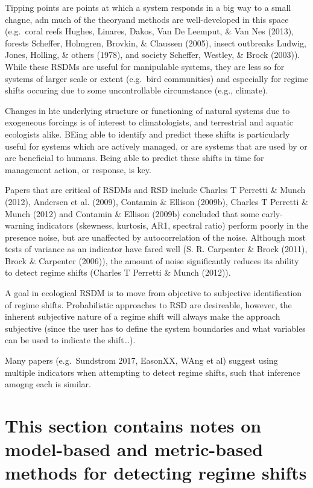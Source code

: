\documentclass[12pt,twoside,openany]{reedthesis}
\begin{document}
Tipping points are points at which a system responds in a big way to a
small chagne, adn much of the theoryand methods are well-developed in
this space (e.g.~coral reefs Hughes, Linares, Dakos, Van De Leemput, \&
Van Nes (2013), forests Scheffer, Holmgren, Brovkin, \& Claussen (2005),
insect outbreaks Ludwig, Jones, Holling, \& others (1978), and society
Scheffer, Westley, \& Brock (2003)). While these RSDMs are useful for
manipulable systems, they are less so for systems of larger scale or
extent (e.g.~bird communities) and especially for regime shifts occuring
due to some uncontrollable circumstance (e.g., climate).

Changes in hte underlying structure or functioning of natural systems
due to exogeneous forcings is of interest to climatologists, and
terrestrial and aquatic ecologists alike. BEing able to identify and
predict these shifts is particularly useful for systems which are
actively managed, or are systems that are used by or are beneficial to
humans. Being able to predict these shifts in time for management
action, or response, is key.

Papers that are critical of RSDMs and RSD include Charles T Perretti \&
Munch (2012), Andersen et al. (2009), Contamin \& Ellison (2009b),
Charles T Perretti \& Munch (2012) and Contamin \& Ellison (2009b)
concluded that some early-warning indicators (skewness, kurtosis, AR1,
spectral ratio) perform poorly in the presence noise, but are unaffected
by autocorrelation of the noise. Although most tests of variance as an
indicator have fared well (S. R. Carpenter \& Brock (2011), Brock \&
Carpenter (2006)), the amount of noise significantly reduces its ability
to detect regime shifts (Charles T Perretti \& Munch (2012)).

A goal in ecological RSDM is to move from objective to subjective
identification of regime shifts. Probabilistic approaches to RSD are
desireable, however, the inherent subjective nature of a regime shift
will always make the approach subjective (since the user has to define
the system boundaries and what variables can be used to indicate the
shift\ldots{}).

Many papers (e.g.~Sundstrom 2017, EasonXX, WAng et al) suggest using
multiple indicators when attempting to detect regime shifts, such that
inference amogng each is similar.

\section{This section contains notes on model-based and metric-based
methods for detecting regime
shifts}\label{this-section-contains-notes-on-model-based-and-metric-based-methods-for-detecting-regime-shifts}
\end{document}
